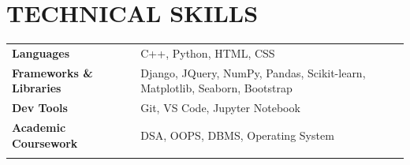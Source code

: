 \documentclass[12pt]{article}
\begin{document}
\section*{TECHNICAL SKILLS}
\begin{tabular}{@{}llll}
	\textbf{Languages}               && C++, Python, HTML, CSS                                               		\\
	\textbf{Frameworks \& Libraries} && Django, JQuery, NumPy, Pandas, Scikit-learn, Matplotlib, Seaborn, Bootstrap \\
	\textbf{Dev Tools}               && Git, VS Code, Jupyter Notebook                                              \\
	\textbf{Academic Coursework}     && DSA, OOPS, DBMS, Operating System                                           \\
	\vspace{-\topsep}
\end{tabular}
\end{document}
